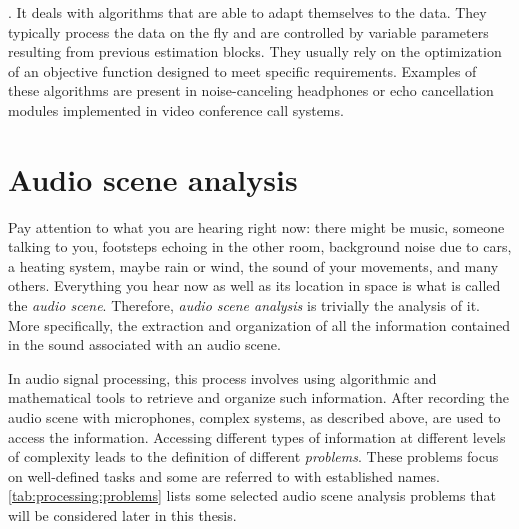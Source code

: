.
    It deals with algorithms that are able to adapt themselves to the data.
    They typically process the data on the fly and are controlled by variable parameters resulting from previous estimation blocks.
    They usually rely on the optimization of an objective function designed to meet specific requirements.
    Examples of these algorithms are present in noise-canceling headphones or echo cancellation modules implemented in video conference call systems.



\section{Audio scene analysis}\label{sec:intro:scene}
Pay attention to what you are hearing right now:
there might be music, someone talking to you, footsteps echoing in the other room, background noise due to cars, a heating system, maybe rain or wind, the sound of your movements, and many others.
Everything you hear now as well as its location in space is what is called the \textit{audio scene}.
Therefore, \textit{audio scene analysis} is trivially the analysis of it.
More specifically, the extraction and organization of all the information contained in the sound associated with an audio scene.

\mynewline
In audio signal processing, this process involves using algorithmic and mathematical tools to retrieve and organize such information.
After recording the audio scene with microphones, complex systems, as described above, are used to access the information.
Accessing different types of information at different levels of complexity leads to the definition of different \textit{problems}.
These problems focus on well-defined tasks and some are referred to with established names.
\cref{tab:processing:problems} lists some selected audio scene analysis problems that will be considered later in this thesis.

